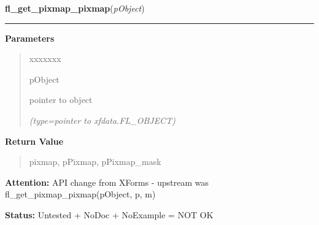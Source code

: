 \hspace{.8\funcindent}\begin{boxedminipage}{\funcwidth}

    \raggedright \textbf{fl\_get\_pixmap\_pixmap}(\textit{pObject})

    \vspace{-1.5ex}

    \rule{\textwidth}{0.5\fboxrule}
\setlength{\parskip}{2ex}
\setlength{\parskip}{1ex}
      \textbf{Parameters}
      \vspace{-1ex}

      \begin{quote}
        \begin{Ventry}{xxxxxxx}

          \item[pObject]

          pointer to object

            {\it (type=pointer to xfdata.FL\_OBJECT)}

        \end{Ventry}

      \end{quote}

      \textbf{Return Value}
    \vspace{-1ex}

      \begin{quote}
      pixmap, pPixmap, pPixmap\_mask

      \end{quote}

\textbf{Attention:} API change from XForms - upstream was fl\_get\_pixmap\_pixmap(pObject, p, 
m)



\textbf{Status:} Untested + NoDoc + NoExample = NOT OK



    \end{boxedminipage}

    \label{xformslib:library:fl_get_pixmap_pixmap}

    \vspace{0.5ex}

